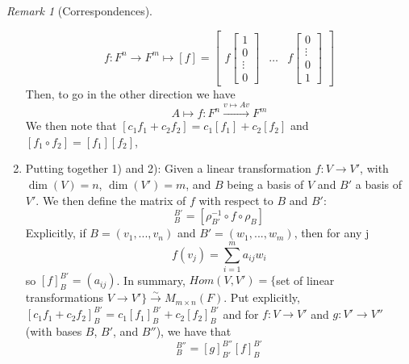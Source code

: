 \documentclass[12pt]{article}
\theoremstyle{definition}
\theoremstyle{remark}
\newtheorem{rmk}[thm]{Remark}
\numberwithin{equation}{section}
\begin{document}
\begin{rmk}[Correspondences]
\begin{enumerate}
\begin{equation}
                        f:F^n\rightarrow F^m\mapsto [f] = \begin{bmatrix}f\begin{bmatrix} 1 \\ 0 \\ \vdots \\ 0 \end{bmatrix} & \hdots & f\begin{bmatrix} 0 \\ \vdots \\ 0 \\ 1 \end{bmatrix}\end{bmatrix}
        \end{equation}
                        Then, to go in the other direction we have \begin{equation}
                                A \mapsto f:F^n\xrightarrow{v\mapsto Av} F^m
                        \end{equation}
                        We then note that $[c_1f_1+c_2f_2] = c_1[f_1]+c_2[f_2]$ and $[f_1\circ f_2] = [f_1][f_2]$,
                \item Putting together 1) and 2): Given a linear transformation $f:V \rightarrow V'$, with $\dim(V) = n$, $\dim(V') = m$, and $B$ being a basis of $V$ and $B'$ a basis of $V'$. We then define the matrix of $f$ with respect to $B$ and $B'$: \begin{equation}
                                [f]_B^{B'} = [\rho_{B'}^{-1}\circ f \circ \rho_B]
                \end{equation}
                        Explicitly, if $B = (v_1,...,v_n)$ and $B' = (w_1,...,w_m)$, then for any j \begin{equation}
                                f(v_j) = \sum\limits_{i=1}^ma_{ij}w_i
                        \end{equation}
                        so $[f]_B^{B'} = (a_{ij})$. In summary, $Hom(V,V')=\{$set of linear transformations $V\rightarrow V'\}\xrightarrow{\sim}M_{m\times n}(F)$. Put explicitly, $[c_1f_1+c_2f_2]_B^{B'} = c_1[f_1]_B^{B'} + c_2[f_2]_B^{B'}$ and for $f:V\rightarrow V'$ and $g:V'\rightarrow V''$ (with bases $B$, $B'$, and $B''$), we have that \begin{equation}
                                [g\circ f]_B^{B''} = [g]_{B'}^{B''}[f]_B^{B'}
                        \end{equation}
        \end{enumerate}
\end{rmk}
\end{document}

